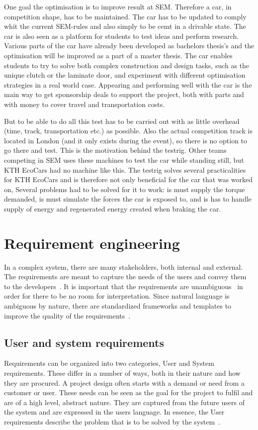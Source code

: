 One goal the optimisation is to improve result at SEM\@. Therefore a car, in competition shape, has to be maintained. The car has to be updated to comply whit the current SEM-rules and also simply to be cemt in a drivable state. The car is also seen as a platform for students to test ideas and perform research. Various parts of the car have already been developed as bachelors thesis's and the optimisation will be improved as a part of a master thesis. The car enables students to try to solve both complex construction and design tasks, such as the unique clutch or the laminate door, and experiment with different optimisation strategies in a real world case. Appearing and performing well with the car is the main way to get sponsorship deals to support the project, both with parts and with money to cover travel and transportation costs.

But to be able to do all this test has to be carried out with as little overhead (time, track, transportation etc.) as possible. Also the actual competition track is located in London (and it only exists during the event), so there is no option to go there and test. This is the motivation behind the testrig. Other teams competing in SEM uses these machines to test the car while standing still, but KTH EcoCars had no machine like this. The testrig solves several practicalities for KTH EcoCars and is therefore not only beneficial for the car that was worked on, Several problems had to be solved for it to work: is must supply the torque demanded, is must simulate the forces the car is exposed to, and is has to handle supply of energy and regenerated energy created when braking the car.

\section{Requirement engineering}
In a complex system, there are many stakeholders, both internal and external.
The requirements are meant to capture the needs of the users and convey them to
the developers~\cite{ibm_req}. It is important that the requirements are
unambiguous~\cite{ibm_req, rupp2014} in order for there to be no room for
interpretation. Since natural language is ambiguous by nature, there are
standardized frameworks and templates to improve the quality of the
requirements~\cite{rupp2014}. 

\subsection{User and system requirements}\label{sec:req_usr_sys}
Requirements can be organized into two categories, User and System requirements.
These differ in a number of ways, both in their nature and how they are
procured. A project design often starts with a demand or need from a customer or user.
These needs can be seen as the goal for the project to fulfil and are of a high
level, abstract nature. They are captured from the future users of the system
and are expressed in the users language. In essence, the User requirements
describe the problem that is to be solved by the system~\cite{ibm_req}. 

